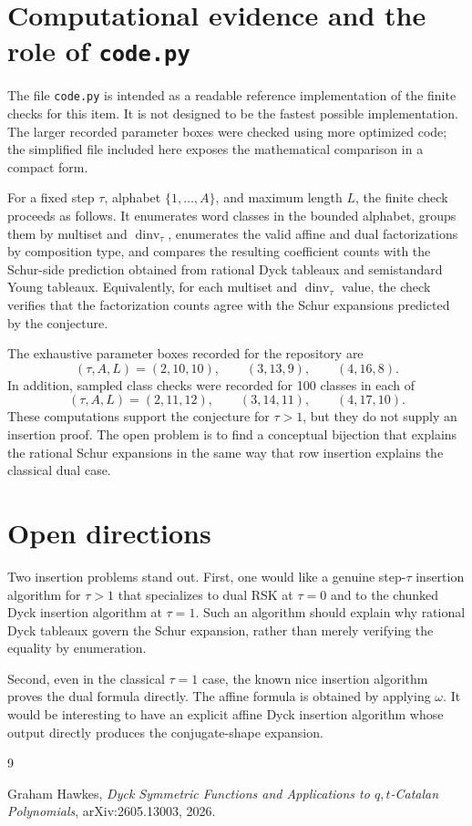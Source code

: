 \documentclass{article}
\DeclareMathOperator{\dinv}{dinv}
\begin{document}
\section{Computational evidence and the role of \texttt{code.py}}

The file \texttt{code.py} is intended as a readable reference implementation
of the finite checks for this item.  It is not designed to be the fastest
possible implementation.  The larger recorded parameter boxes were checked
using more optimized code; the simplified file included here exposes the
mathematical comparison in a compact form.

For a fixed step \(\tau\), alphabet \(\{1,\ldots,A\}\), and maximum length
\(L\), the finite check proceeds as follows.  It enumerates word classes in the
bounded alphabet, groups them by multiset and \(\dinv_\tau\), enumerates the
valid affine and dual factorizations by composition type, and compares the
resulting coefficient counts with the Schur-side prediction obtained from
rational Dyck tableaux and semistandard Young tableaux.  Equivalently, for
each multiset and \(\dinv_\tau\) value, the check verifies that the
factorization counts agree with the Schur expansions predicted by the
conjecture.

The exhaustive parameter boxes recorded for the repository are
\[
  (\tau,A,L)=(2,10,10),\qquad (3,13,9),\qquad (4,16,8).
\]
In addition, sampled class checks were recorded for 100 classes in each of
\[
  (\tau,A,L)=(2,11,12),\qquad (3,14,11),\qquad (4,17,10).
\]
These computations support the conjecture for \(\tau>1\), but they do not
supply an insertion proof.  The open problem is to find a conceptual bijection
that explains the rational Schur expansions in the same way that row insertion
explains the classical dual case.

\section{Open directions}

Two insertion problems stand out.  First, one would like a genuine
step-\(\tau\) insertion algorithm for \(\tau>1\) that specializes to dual RSK
at \(\tau=0\) and to the chunked Dyck insertion algorithm at \(\tau=1\).  Such
an algorithm should explain why rational Dyck tableaux govern the Schur
expansion, rather than merely verifying the equality by enumeration.

Second, even in the classical \(\tau=1\) case, the known nice insertion
algorithm proves the dual formula directly.  The affine formula is obtained by
applying \(\omega\).  It would be interesting to have an explicit affine Dyck
insertion algorithm whose output directly produces the conjugate-shape
expansion.

\begin{thebibliography}{9}

Graham Hawkes,
\emph{Dyck Symmetric Functions and Applications to \(q,t\)-Catalan
Polynomials},
arXiv:2605.13003, 2026.

\end{thebibliography}
\end{document}
